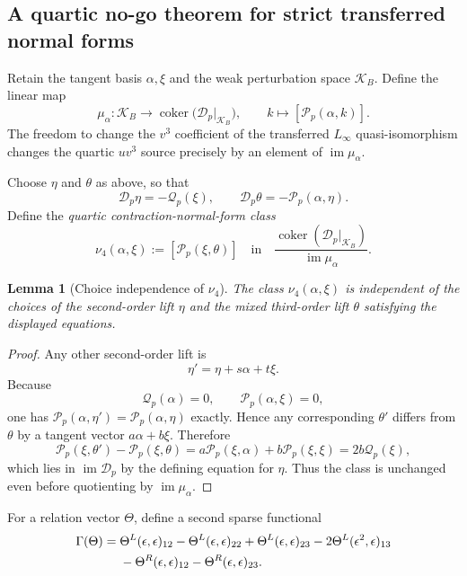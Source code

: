 \documentclass[11pt]{amsart}
\newtheorem{lemma}[theorem]{Lemma}
\newcommand{\coker}{\operatorname{coker}}
\newcommand{\cD}{\mathscr D}
\newcommand{\cQ}{\mathscr Q}
\newcommand{\cP}{\mathscr P}
\begin{document}
\subsection{A quartic no-go theorem for strict transferred normal forms}\label{subsec:strict-transfer-no-go}

Retain the tangent basis $\alpha,\xi$ and the weak perturbation space $\mathcal K_B$.  Define the linear map
\[
\mu_\alpha:\mathcal K_B\longrightarrow
\coker\bigl(\cD_p|_{\mathcal K_B}\bigr),
\qquad
k\longmapsto [\cP_p(\alpha,k)].
\]
The freedom to change the $v^3$ coefficient of the transferred $L_\infty$ quasi-isomorphism changes the quartic $uv^3$ source precisely by an element of $\operatorname{im}\mu_\alpha$.

Choose $\eta$ and $\theta$ as above, so that
\[
\cD_p\eta=-\cQ_p(\xi),
\qquad
\cD_p\theta=-\cP_p(\alpha,\eta).
\]
Define the \emph{quartic contraction-normal-form class}
\[
\boxed{
\nu_4(\alpha,\xi)
:=
[\cP_p(\xi,\theta)]
\quad\text{in}\quad
\frac{
\coker(\cD_p|_{\mathcal K_B})
}{\operatorname{im}\mu_\alpha}.
}
\]

\begin{lemma}[Choice independence of $\nu_4$]\label{lem:quartic-choice-independence}
The class $\nu_4(\alpha,\xi)$ is independent of the choices of the second-order lift $\eta$ and the mixed third-order lift $\theta$ satisfying the displayed equations.
\end{lemma}

\begin{proof}
Any other second-order lift is
\[
\eta'=\eta+s\alpha+t\xi.
\]
Because
\[
\cQ_p(\alpha)=0,
\qquad
\cP_p(\alpha,\xi)=0,
\]
one has $\cP_p(\alpha,\eta')=\cP_p(\alpha,\eta)$ exactly.  Hence any corresponding $\theta'$ differs from $\theta$ by a tangent vector $a\alpha+b\xi$.  Therefore
\[
\cP_p(\xi,\theta')-\cP_p(\xi,\theta)
=
 a\cP_p(\xi,\alpha)+b\cP_p(\xi,\xi)
=
2b\cQ_p(\xi),
\]
which lies in $\operatorname{im}\cD_p$ by the defining equation for $\eta$.  Thus the class is unchanged even before quotienting by $\operatorname{im}\mu_\alpha$.
\end{proof}

For a relation vector $\Theta$, define a second sparse functional
\begin{align}\label{eq:quartic-certificate}
\Gamma(\Theta)
={}&
\Theta^L(\epsilon,\epsilon)_{12}
-\Theta^L(\epsilon,\epsilon)_{22}
+\Theta^L(\epsilon,\epsilon)_{23}
-2\Theta^L(\epsilon^2,\epsilon)_{13}\notag\\
&-\Theta^R(\epsilon,\epsilon)_{12}
-\Theta^R(\epsilon,\epsilon)_{23}.
\end{align}
\end{document}
